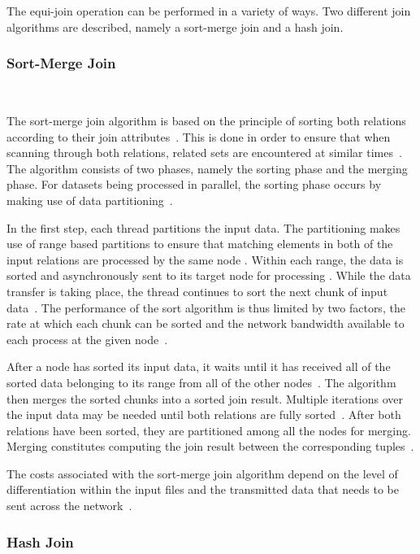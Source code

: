 \documentclass[12pt,twocolumn]{witseiepaper}
\begin{document}
The equi-join operation can be performed in a variety of ways. Two different join algorithms are described, namely a sort-merge join and a hash join.

\subsubsection{Sort-Merge Join}\label{sortmerge}$   $

The sort-merge join algorithm is based on the principle of sorting both relations according to their join attributes~\cite{thomas_zurek_optimisation_1997}. This is done in order to ensure that when scanning through both relations, related sets are encountered at similar times~\cite{thomas_zurek_optimisation_1997}. The algorithm consists of two phases, namely the sorting phase and the merging phase. For datasets being processed in parallel, the sorting phase occurs by making use of data partitioning~\cite{dist}.

In the first step, each thread partitions the input data. The partitioning makes use of range based partitions to ensure that matching elements in both of the input relations are processed by the same node \cite{dist}. Within each range, the data is sorted and asynchronously sent to its target node for processing \cite{dist}. While the data transfer is taking place, the thread continues to sort the next chunk of input data~\cite{dist}. The performance of the sort algorithm is thus limited by two factors, the rate at which each chunk can be sorted and the network bandwidth available to each process at the given node~\cite{dist}.

After a node has sorted its input data, it waits until it has received all of the sorted data belonging to its range from all of the other nodes~\cite{dist}. The algorithm then merges the sorted chunks into a sorted join result. Multiple iterations over the input data may be needed until both relations are fully sorted~\cite{dist}. After both relations have been sorted, they are partitioned among all the nodes for merging. Merging constitutes computing the join result between the corresponding tuples~\cite{dist}.

The costs associated with the sort-merge join algorithm depend on the level of differentiation within the input files and the transmitted data that needs to be sent across the network~\cite{dist}.

\subsubsection{Hash Join}$    $
\end{document}
